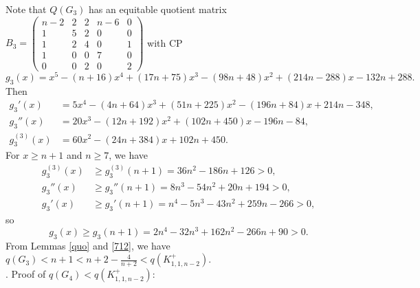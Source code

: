 \documentclass[12pt]{article}
\begin{document}
\begin{appendices}
Note that $Q(G_3)$ has an equitable quotient matrix
$B_3=
\left(\begin{smallmatrix}
n-2 &  2  & 2  & n-6 & 0 \\
1   &  5  & 2  & 0   & 0 \\
1   &  2  & 4  & 0   & 1 \\
1   &  0  & 0  & 7   & 0 \\
0   &  0  & 2  & 0   & 2
\end{smallmatrix}\right)$
with CP
\[
g_3(x)=x^5 - ( n  +16)x^4 + (17n + 75)x^3 - ( 98n +48)x^2 + (214n - 288)x - 132n + 288.
\]
Then
\begin{align*}
g_3'(x)&=5x^4 - ( 4n + 64)x^3 + (51n + 225)x^2 - ( 196n + 84)x + 214n - 348,\\
g_3''(x)&=20x^3 - (12n + 192)x^2 + (102n + 450)x - 196n - 84,\\
g_3^{(3)}(x)&=60x^2 - (24n + 384)x + 102n + 450.
\end{align*}
For $x\ge n+1$ and $n\ge 7$, we have
\begin{align*}
g_3^{(3)}(x)&\ge g_3^{(3)}(n+1)=36n^2 - 186n + 126>0,\\
g_3''(x)&\ge g_3''(n+1)=8n^3 - 54n^2 + 20n + 194>0,\\
g_3'(x)&\ge g_3'(n+1)=n^4 - 5n^3 - 43n^2 + 259n - 266>0,
\end{align*}
so
\[
g_3(x)\ge g_3(n+1)=2n^4 - 32n^3 + 162n^2 - 266n + 90>0.
\]
From Lemmas \ref{quo} and \ref{712}, we have $q(G_3)<n+1<n+2-\frac{4}{n+2}<q(K_{1,1,n-2}^+)$.\\



. Proof of  $q(G_4)<q(K_{1,1,n-2}^+)$:


\end{appendices}
\end{document}
